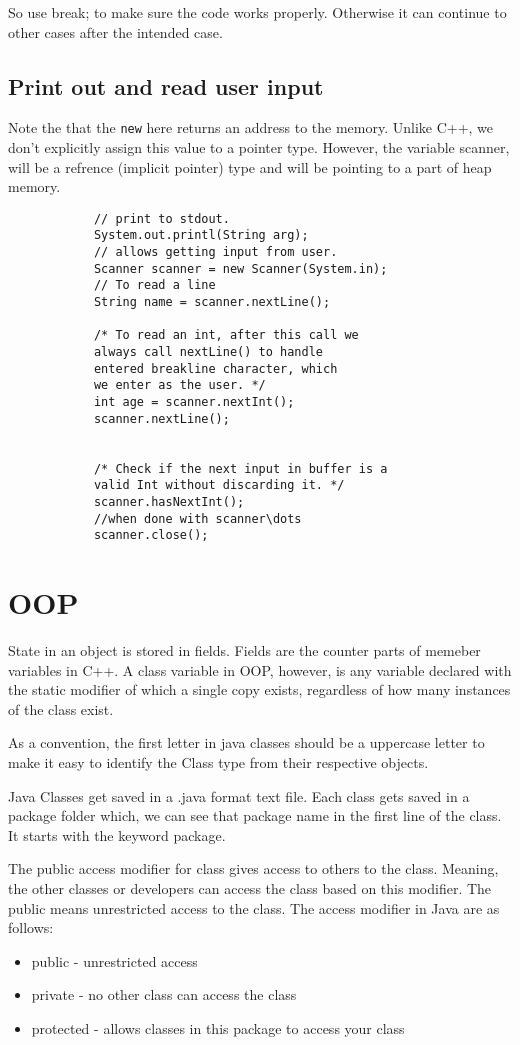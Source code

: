 \documentclass[11pt,twoside,a4paper]{report}
\begin{document}
So use break; to make sure the code works properly. Otherwise it can continue to other cases after the intended case.

\section{Print out and read user input}
Note the that the \verb|new| here returns an address to the memory. Unlike C++, we don't explicitly assign this value to a pointer type.
However, the variable scanner, will be a refrence (implicit pointer) type and will be pointing to a part of heap memory.
\begin{lstlisting}
            // print to stdout.
            System.out.printl(String arg);
            // allows getting input from user.
            Scanner scanner = new Scanner(System.in);
            // To read a line
            String name = scanner.nextLine();

            /* To read an int, after this call we 
            always call nextLine() to handle 
            entered breakline character, which 
            we enter as the user. */
            int age = scanner.nextInt();
            scanner.nextLine();
            

            /* Check if the next input in buffer is a 
            valid Int without discarding it. */
            scanner.hasNextInt();
            //when done with scanner\dots
            scanner.close();
            \end{lstlisting}

\chapter{OOP}
State in an object is stored in fields. Fields are the counter parts of memeber variables in C++.
A class variable in OOP, however, is any variable declared with the static modifier of which a single copy exists, regardless of how many instances of the class exist.

As a convention, the first letter in java classes should be a uppercase letter to make it easy to identify the Class type from their respective objects.

Java Classes get saved in a .java format text file. Each class gets saved in a package folder which, we can see that package name in the first line of the class. It starts with the keyword package.

The public access modifier for class gives access to others to the class. Meaning, the other classes or developers can access the class based on this modifier. 
The public means unrestricted access to the class.
The access modifier in Java are as follows:
\begin{itemize}
    \item public - unrestricted access
    \item private - no other class can access the class
    \item protected - allows classes in this package to access your class
\end{itemize}
\end{document}
